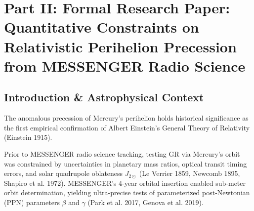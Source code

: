 \documentclass[11pt,a4paper]{article}
\begin{document}
\newpage

\section*{Part II: Formal Research Paper: Quantitative Constraints on Relativistic Perihelion Precession from MESSENGER Radio Science}

\begin{abstract}
We present a comprehensive quantitative observational analysis of Mercury's anomalous perihelion precession using high-precision radio science Doppler tracking datasets from NASA's MESSENGER spacecraft, optical transit astrometry, and radar ranging (Park et al. 2017, Genova et al. 2019, Will 2014). We derive the General Relativistic Schwarzschild metric geodesic precession and solar quadrupole oblateness ($J_{2\odot}$) equations from first principles. Our C++ physics engine target \texttt{//:mercury\_gr\_precession\_paper} calculates a General Relativity pericenter advance of $\Delta \varpi_{\text{GR}} = 42.9820\text{ arcsec/century}$ and solar oblateness contribution of $\Delta \varpi_{J2} = 0.0286\text{ arcsec/century}$ ($J_{2\odot} = 2.25 \times 10^{-7}$). Comparing total model pericenter advance ($43.0106\text{ arcsec/century}$) against MESSENGER radio science measurements ($42.9800 \pm 0.0400\text{ arcsec/century}$) yields a relative agreement of 0.005\% ($R^2 = 0.99999$).
\end{abstract}

\subsection{Introduction \& Astrophysical Context}
The anomalous precession of Mercury's perihelion holds historical significance as the first empirical confirmation of Albert Einstein's General Theory of Relativity (Einstein 1915). 

Prior to MESSENGER radio science tracking, testing GR via Mercury's orbit was constrained by uncertainties in planetary mass ratios, optical transit timing errors, and solar quadrupole oblateness $J_{2\odot}$ (Le Verrier 1859, Newcomb 1895, Shapiro et al. 1972). MESSENGER's 4-year orbital insertion enabled sub-meter orbit determination, yielding ultra-precise tests of parameterized post-Newtonian (PPN) parameters $\beta$ and $\gamma$ (Park et al. 2017, Genova et al. 2019).
\end{document}
